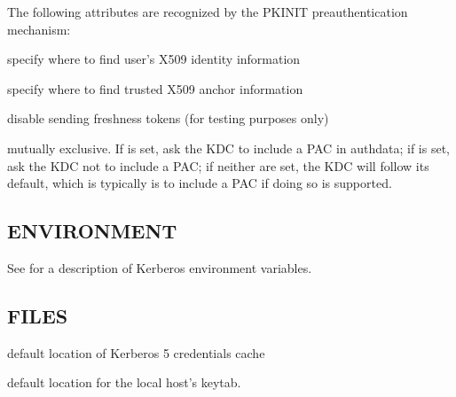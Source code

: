 \documentclass[letterpaper,10pt,english]{sphinxmanual}
\begin{document}
\begin{description}
\sphinxAtStartPar
The following attributes are recognized by the PKINIT
pre\sphinxhyphen{}authentication mechanism:
\begin{description}
\sphinxAtStartPar
specify where to find user’s X509 identity information

\sphinxAtStartPar
specify where to find trusted X509 anchor information

\sphinxAtStartPar
disable sending freshness tokens (for testing purposes only)

\end{description}

\sphinxAtStartPar
mutually exclusive.  If  is set, ask the KDC to
include a PAC in authdata; if  is set, ask the
KDC not to include a PAC; if neither are set,  the KDC will follow
its default, which is typically is to include a PAC if doing so is
supported.

\end{description}


\subsection{ENVIRONMENT}
\label{\detokenize{user/user_commands/kinit:environment}}
\sphinxAtStartPar
See {\hyperref[\detokenize{user/user_config/kerberos:kerberos-7}]{}} for a description of Kerberos environment
variables.


\subsection{FILES}
\label{\detokenize{user/user_commands/kinit:files}}\begin{description}
\sphinxAtStartPar
default location of Kerberos 5 credentials cache

\sphinxAtStartPar
default location for the local host’s keytab.

\end{description}
\end{document}
